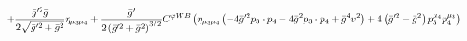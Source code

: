 %
\begin{dmath*}
%
  +  \frac{{\bar g}^{\prime 2} {\bar g}{}}{2 \sqrt{{\bar g}^{\prime 2} + {\bar g}{}^2}}\eta_{\mu_3 \mu_4}  +  \frac{{\bar g}^\prime}{2 \left({\bar g}^{\prime 2} + {\bar g}{}^2\right)^{3/2}}C^{ \varphi  WB} \left(\eta_{\mu_3 \mu_4} \left( - 4 {\bar g}^{\prime 2} p_{3}\nobreak\cdot\nobreak{}p_{4} - 4 {\bar g}{}^2 p_{3}\nobreak\cdot\nobreak{}p_{4} + {\bar g}{}^4 v^2\right) + 4 \left({\bar g}^{\prime 2} + {\bar g}{}^2\right) p_3^{\mu_4} p_4^{\mu_3}\right)
%
\end{dmath*}
%
